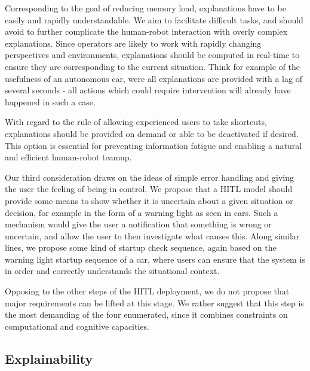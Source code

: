 \documentclass[twoside,11pt]{article}
\begin{document}
Corresponding to the goal of reducing memory load, explanations have to be easily and rapidly understandable. We aim to facilitate difficult tasks, and should avoid to further complicate the human-robot interaction with overly complex explanations. Since operators are likely to work with rapidly changing perspectives and environments, explanations should be computed in real-time to ensure they are corresponding to the current situation. Think for example of the usefulness of an autonomous car, were all explanations are provided with a lag of several seconds - all actions which could require intervention will already have happened in such a case. 

With regard to the rule of allowing experienced users to take shortcuts, explanations should be provided on demand or able to be deactivated if desired. This option is essential for preventing information fatigue and enabling a natural and efficient human-robot teamup. 

Our third consideration draws on the ideas of simple error handling and giving the user the feeling of being in control. We propose that a HITL model should provide some means to show whether it is uncertain about a given situation or decision, for example in the form of a warning light as seen in cars. Such a mechanism would give the user a notification that something is wrong or uncertain, and allow the user to then investigate what causes this.  Along similar lines, we propose some kind of startup check sequence, again based on the warning light startup sequence of a car, where users can ensure that the system is in order and correctly understands the situational context.

Opposing to the other steps of the HITL deployment, we do not propose that major requirements can be lifted at this stage. We rather suggest that this step is the most demanding of the four enumerated, since it combines constraints on computational and cognitive capacities.

\subsection{Explainability}
\end{document}
